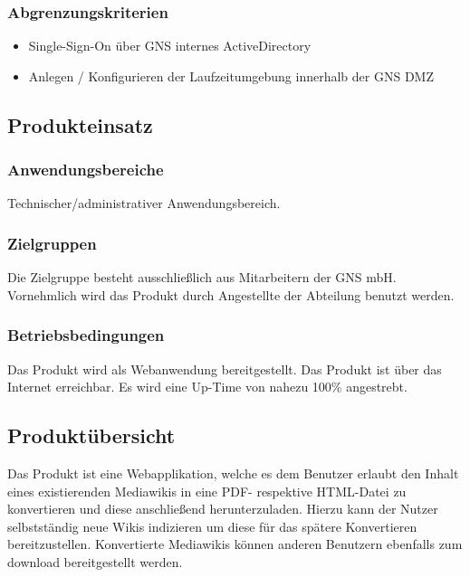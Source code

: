 	\subsubsection*{Abgrenzungskriterien}
		\begin{itemize}
			\item Single-Sign-On über GNS internes ActiveDirectory
			\item Anlegen / Konfigurieren der Laufzeitumgebung innerhalb der GNS DMZ
		\end{itemize}

\subsection*{Produkteinsatz}

	\subsubsection*{Anwendungsbereiche}
		Technischer/administrativer Anwendungsbereich.

	\subsubsection*{Zielgruppen}
		Die Zielgruppe besteht ausschließlich aus Mitarbeitern der GNS mbH.
		Vornehmlich wird das Produkt durch Angestellte der Abteilung benutzt werden.

	\subsubsection*{Betriebsbedingungen}
		Das Produkt wird als Webanwendung bereitgestellt. Das Produkt ist über das Internet erreichbar.
		Es wird eine Up-Time von nahezu 100\% angestrebt.


\subsection*{Produktübersicht}
	Das Produkt ist eine Webapplikation, welche es dem Benutzer erlaubt den Inhalt eines existierenden
	Mediawikis in eine PDF- respektive HTML-Datei zu konvertieren und diese anschließend herunterzuladen.
	Hierzu kann der Nutzer selbstständig neue Wikis indizieren um diese für das spätere Konvertieren
	bereitzustellen. Konvertierte Mediawikis können anderen Benutzern ebenfalls zum download bereitgestellt
	werden.
